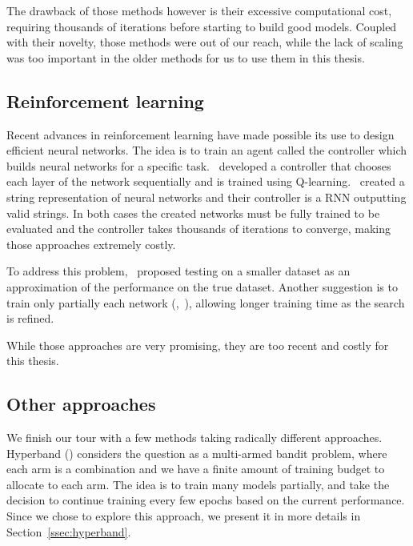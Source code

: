 The drawback of those methods however is their excessive computational cost, requiring thousands of iterations before starting to build good models. Coupled with their novelty, those methods were out of our reach, while the lack of scaling was too important in the older methods for us to use them in this thesis. 

\subsection{Reinforcement learning}

Recent advances in reinforcement learning have made possible its use to design efficient neural networks. The idea is to train an agent called the controller which builds neural networks for a specific task.~\textcite{baker2017ICLR} developed a controller that chooses each layer of the network sequentially and is trained using Q-learning.~\textcite{zoph2017ICLR} created a string representation of neural networks and their controller is a RNN outputting valid strings. In both cases the created networks must be fully trained to be evaluated and the controller takes thousands of iterations to converge, making those approaches extremely costly.

To address this problem,~\textcite{zoph2017} proposed testing on a smaller dataset as an approximation of the performance on the true dataset. Another suggestion is to train only partially each network (\textcite{li2017ICLR},~\textcite{zela2018}), allowing longer training time as the search is refined.

While those approaches are very promising, they are too recent and costly for this thesis.

\subsection{Other approaches}

We finish our tour with a few methods taking radically different approaches. Hyperband (\textcite{li2017ICLR}) considers the question as a multi-armed bandit problem, where each arm is a combination and we have a finite amount of training budget to allocate to each arm. The idea is to train many models partially, and take the decision to continue training every few epochs based on the current performance. Since we chose to explore this approach, we present it in more details in Section~\ref{ssec:hyperband}.

